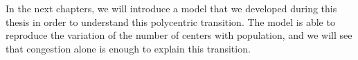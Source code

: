 In the next chapters, we will introduce a model that we developed during this
thesis in order to understand this polycentric transition. The model is able to
reproduce the variation of the number of centers with population, and we will
see that congestion alone is enough to explain this transition.

